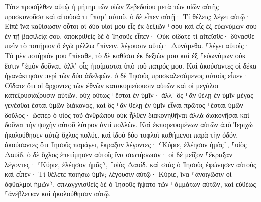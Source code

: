 \documentclass[twoside, 9pt]{extreport}
\begin{document}
Τότε προσῆλθεν αὐτῷ ἡ μήτηρ τῶν υἱῶν Ζεβεδαίου μετὰ τῶν υἱῶν αὐτῆς προσκυνοῦσα καὶ αἰτοῦσά τι ⸀παρ᾽ αὐτοῦ. 
ὁ δὲ εἶπεν αὐτῇ· Τί θέλεις; λέγει αὐτῷ· Εἰπὲ ἵνα καθίσωσιν οὗτοι οἱ δύο υἱοί μου εἷς ἐκ δεξιῶν ⸀σου καὶ εἷς ἐξ εὐωνύμων σου ἐν τῇ βασιλείᾳ σου. 
ἀποκριθεὶς δὲ ὁ Ἰησοῦς εἶπεν· Οὐκ οἴδατε τί αἰτεῖσθε· δύνασθε πιεῖν τὸ ποτήριον ὃ ἐγὼ μέλλω ⸀πίνειν. λέγουσιν αὐτῷ· Δυνάμεθα. 
⸀λέγει αὐτοῖς· Τὸ μὲν ποτήριόν μου ⸀πίεσθε, τὸ δὲ καθίσαι ἐκ δεξιῶν μου καὶ ἐξ ⸀εὐωνύμων οὐκ ἔστιν ⸀ἐμὸν δοῦναι, ἀλλ᾽ οἷς ἡτοίμασται ὑπὸ τοῦ πατρός μου. 
Καὶ ἀκούσαντες οἱ δέκα ἠγανάκτησαν περὶ τῶν δύο ἀδελφῶν. 
ὁ δὲ Ἰησοῦς προσκαλεσάμενος αὐτοὺς εἶπεν· Οἴδατε ὅτι οἱ ἄρχοντες τῶν ἐθνῶν κατακυριεύουσιν αὐτῶν καὶ οἱ μεγάλοι κατεξουσιάζουσιν αὐτῶν. 
οὐχ οὕτως ⸀ἔσται ἐν ὑμῖν· ἀλλ᾽ ὃς ⸀ἂν θέλῃ ἐν ὑμῖν μέγας γενέσθαι ἔσται ὑμῶν διάκονος, 
καὶ ὃς ⸀ἂν θέλῃ ἐν ὑμῖν εἶναι πρῶτος ⸀ἔσται ὑμῶν δοῦλος· 
ὥσπερ ὁ υἱὸς τοῦ ἀνθρώπου οὐκ ἦλθεν διακονηθῆναι ἀλλὰ διακονῆσαι καὶ δοῦναι τὴν ψυχὴν αὐτοῦ λύτρον ἀντὶ πολλῶν. 
Καὶ ἐκπορευομένων αὐτῶν ἀπὸ Ἰεριχὼ ἠκολούθησεν αὐτῷ ὄχλος πολύς. 
καὶ ἰδοὺ δύο τυφλοὶ καθήμενοι παρὰ τὴν ὁδόν, ἀκούσαντες ὅτι Ἰησοῦς παράγει, ἔκραξαν λέγοντες· ⸂Κύριε, ἐλέησον ἡμᾶς⸃, ⸀υἱὸς Δαυίδ. 
ὁ δὲ ὄχλος ἐπετίμησεν αὐτοῖς ἵνα σιωπήσωσιν· οἱ δὲ μεῖζον ⸀ἔκραξαν λέγοντες· ⸂Κύριε, ἐλέησον ἡμᾶς⸃, ⸀υἱὸς Δαυίδ. 
καὶ στὰς ὁ Ἰησοῦς ἐφώνησεν αὐτοὺς καὶ εἶπεν· Τί θέλετε ποιήσω ὑμῖν; 
λέγουσιν αὐτῷ· Κύριε, ἵνα ⸂ἀνοιγῶσιν οἱ ὀφθαλμοὶ ἡμῶν⸃. 
σπλαγχνισθεὶς δὲ ὁ Ἰησοῦς ἥψατο τῶν ⸀ὀμμάτων αὐτῶν, καὶ εὐθέως ⸀ἀνέβλεψαν καὶ ἠκολούθησαν αὐτῷ. 
\end{document}
